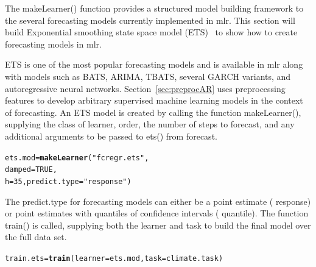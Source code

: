 \documentclass[12pt]{article}\usepackage[]{graphicx}\usepackage[]{color}
\makeatletter
\newcommand{\hlnum}[1]{\textcolor[rgb]{0.686,0.059,0.569}{#1}}%
\newcommand{\hlstr}[1]{\textcolor[rgb]{0.192,0.494,0.8}{#1}}%
\newcommand{\hlstd}[1]{\textcolor[rgb]{0.345,0.345,0.345}{#1}}%
\newcommand{\hlkwb}[1]{\textcolor[rgb]{0.69,0.353,0.396}{#1}}%
\newcommand{\hlkwc}[1]{\textcolor[rgb]{0.333,0.667,0.333}{#1}}%
\newcommand{\hlkwd}[1]{\textcolor[rgb]{0.737,0.353,0.396}{\textbf{#1}}}%
\newenvironment{kframe}{%
 \def\at@end@of@kframe{}%
 \ifinner\ifhmode%
  \def\at@end@of@kframe{\end{minipage}}%
  \begin{minipage}{\columnwidth}%
 \fi\fi%
 \def\FrameCommand##1{\hskip\@totalleftmargin \hskip-\fboxsep
 \colorbox{shadecolor}{##1}\hskip-\fboxsep
     \hskip-\linewidth \hskip-\@totalleftmargin \hskip\columnwidth}%
 \MakeFramed {\advance\hsize-\width
   \@totalleftmargin\z@ \linewidth\hsize
   \@setminipage}}%
 {\par\unskip\endMakeFramed%
 \at@end@of@kframe}
\newenvironment{knitrout}{}{} %
\theoremstyle{definition}
\newcommand\code{\@codex}
\def\@codex#1{{\normalfont\ttfamily\hyphenchar\font=-1 #1}}
\newcommand{\pkg}[1]{{\fontseries{b}\selectfont #1}}
\makeatother
\begin{document}
The \code{makeLearner()} function provides a structured model building framework to the several forecasting models currently implemented in \pkg{mlr}. This section will build Exponential smoothing state space model (ETS)~\cite{etsMod} to show how to create forecasting models in \pkg{mlr}.

ETS is one of the most popular forecasting models and is available in \pkg{mlr} along with models such as BATS, ARIMA, TBATS, several GARCH variants, and autoregressive neural networks. Section~\ref{sec:preprocAR} uses preprocessing features to develop arbitrary supervised machine learning models in the context of forecasting. An ETS model is created by calling the function \code{makeLearner()}, supplying the class of learner, order, the number of steps to forecast, and any additional arguments to be passed to \code{ets()} from \pkg{forecast}. 

\singlespacing
\begin{knitrout}
\color{fgcolor}\begin{kframe}
\begin{alltt}
\hlstd{ets.mod} \hlkwb{=}\hlkwd{makeLearner}\hlstd{(}\hlstr{"fcregr.ets"}\hlstd{,}
                     \hlkwc{damped} \hlstd{=} \hlnum{TRUE}\hlstd{,}
                     \hlkwc{h} \hlstd{=} \hlnum{35}\hlstd{,} \hlkwc{predict.type} \hlstd{=} \hlstr{"response"}\hlstd{)}
\end{alltt}
\end{kframe}
\end{knitrout}
\doublespacing

The \code{predict.type} for forecasting models can either be a point estimate (\code{response}) or point estimates with quantiles of confidence intervals (\code{quantile}). The function \code{train()} is called, supplying both the learner and task to build the final model over the full data set.

\singlespace
\begin{knitrout}
\color{fgcolor}\begin{kframe}
\begin{alltt}
\hlstd{train.ets} \hlkwb{=} \hlkwd{train}\hlstd{(}\hlkwc{learner} \hlstd{= ets.mod,} \hlkwc{task} \hlstd{= climate.task )}
\end{alltt}
\end{kframe}
\end{knitrout}
\doublespace
\end{document}
